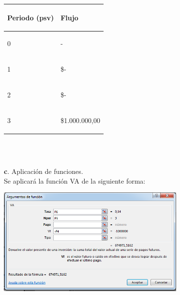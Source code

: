 \begin{spacing}{0.1}
\begin{center}
\begin{tabular}{ |p{3.5cm}| p{3cm}|}
\hline 

\begin{center}\textbf{Periodo (psv) } \end{center}  & \begin{center} \textbf{Flujo} \end{center}  \\ \hline

\begin{center} 0 \end{center}   &  \begin{center} - \end{center}\\\hline

\begin{center}1 \end{center}    &  \begin{center} \$- \end{center} \\ \hline

\begin{center}2 \end{center}    &  \begin{center} \$- \end{center} \\ \hline 

\begin{center}3 \end{center}    & \begin{center} \$1.000.000,00 \end{center}  \\ \hline


\end{tabular}
\end{center}
\end{spacing}
\\ \\

\vspace{2mm}
\vspace{2mm}
 
\textbf{c}. Aplicación de funciones.
 \\
 
Se aplicará la función VA de la siguiente forma:     
 
 \begin{center}
	\includegraphics[height=5.4cm]{img/ch8/8_1.png}
\end{center}

